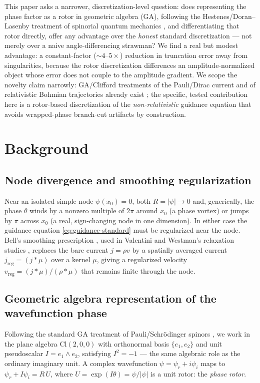 \documentclass[11pt]{article}
\newcommand{\Cl}{\mathrm{Cl}}
\begin{document}
This paper asks a narrower, discretization-level question: does representing the phase factor as a rotor in geometric algebra (GA), following the Hestenes/Doran--Lasenby treatment of spinorial quantum mechanics \cite{hestenes2003sta}, and differentiating that rotor directly, offer any advantage over the \emph{honest} standard discretization — not merely over a naive angle-differencing strawman? We find a real but modest advantage: a constant-factor ($\sim\!4$--$5\times$) reduction in truncation error away from singularities, because the rotor discretization differences an amplitude-normalized object whose error does not couple to the amplitude gradient. We scope the novelty claim narrowly: GA/Clifford treatments of the Pauli/Dirac current and of relativistic Bohmian trajectories already exist \cite{hestenes2003sta,colin2012dirac}; the specific, tested contribution here is a rotor-based discretization of the \emph{non-relativistic} guidance equation that avoids wrapped-phase branch-cut artifacts by construction.

\section{Background}

\subsection{Node divergence and smoothing regularization}

Near an isolated simple node $\psi(x_0)=0$, both $R=|\psi|\to0$ and, generically, the phase $\theta$ winds by a nonzero multiple of $2\pi$ around $x_0$ (a phase vortex) or jumps by $\pi$ across $x_0$ (a real, sign-changing node in one dimension). In either case the guidance equation \eqref{eq:guidance-standard} must be regularized near the node. Bell's smoothing prescription \cite{bell1987}, used in Valentini and Westman's relaxation studies \cite{valentini2005dynamical}, replaces the bare current $j=\rho v$ by a spatially averaged current $j_{\mathrm{reg}}=(j\ast\mu)$ over a kernel $\mu$, giving a regularized velocity $v_{\mathrm{reg}}=(j\ast\mu)/(\rho\ast\mu)$ that remains finite through the node.

\subsection{Geometric algebra representation of the wavefunction phase}

Following the standard GA treatment of Pauli/Schr\"odinger spinors \cite{hestenes2003sta}, we work in the plane algebra $\Cl(2,0,0)$ with orthonormal basis $\{e_1,e_2\}$ and unit pseudoscalar $I=e_1\wedge e_2$, satisfying $I^2=-1$ — the same algebraic role as the ordinary imaginary unit. A complex wavefunction $\psi=\psi_r+i\psi_i$ maps to $\psi_r+I\psi_i = R\,U$, where $U=\exp(I\theta)=\psi/|\psi|$ is a unit rotor: the \emph{phase rotor}.
\end{document}
